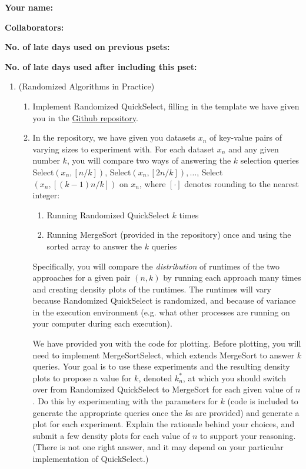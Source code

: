 \documentclass[11pt]{article}
\begin{document}

\textbf{Your name: }

\textbf{Collaborators: }

\textbf{No. of late days used on previous psets: }

\textbf{No. of late days used after including this pset: }

\begin{enumerate}
    \item (Randomized Algorithms in Practice)  
    \begin{enumerate}
        \item Implement Randomized QuickSelect, filling in the template we have given you in the \href{https://github.com/Harvard-CS-120/cs120/tree/main/fall2022/psets}{Github repository}.  
        
        \item 
        In the repository, we have given you datasets $x_n$ of key-value pairs of varying sizes to experiment with.  For each dataset $x_n$ and any given number $k$, you will compare two ways of answering the $k$ selection queries
        Select$(x_n,[n/k])$, Select$(x_n,[2n/k]), \ldots$, Select$(x_n,[(k-1)n/k])$ on $x_n$, where $[\cdot]$ denotes rounding to the nearest integer:
        \begin{enumerate}
            \item Running Randomized QuickSelect $k$ times
            \item Running MergeSort (provided in the repository) once and using the sorted array to answer the $k$ queries
        \end{enumerate}
        Specifically, you will compare the {\em distribution} of runtimes of the two approaches for a given pair $(n,k)$ by running each approach many times and creating density plots of the runtimes.  The runtimes will vary because Randomized QuickSelect  is randomized, and because of variance in the execution environment (e.g. what other processes are running on your computer during each execution).
        
        We have provided you with the code for plotting. Before plotting, you will need to implement MergeSortSelect, which extends MergeSort to answer $k$ queries. Your goal is to use these experiments and the resulting density plots to propose a value for $k$, denoted $k^*_n$, at which you should switch over from Randomized QuickSelect to MergeSort for each given value of $n$. Do this by experimenting with the parameters for $k$ (code is included to generate the appropriate queries once the $k$s are provided) and generate a plot for each experiment.  Explain the rationale behind your choices, and submit a few density plots for each value of $n$ to support your reasoning.  (There is not one right answer, and it may depend on your particular implementation of QuickSelect.) 


\end{enumerate}
\end{enumerate}
\end{document}
